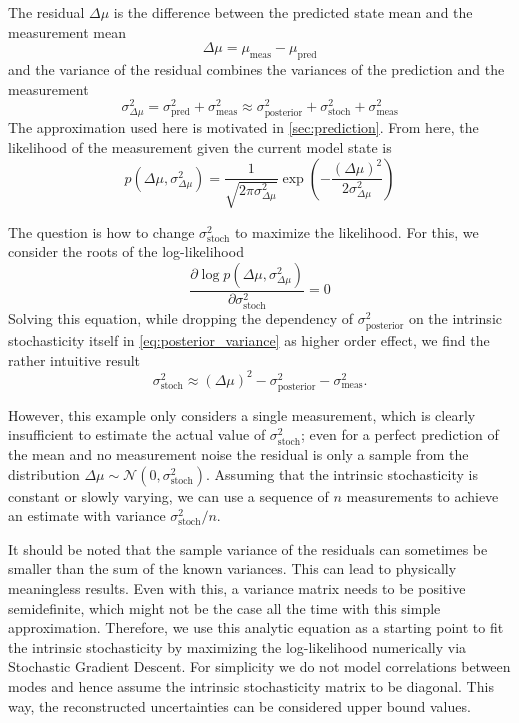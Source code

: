 \documentclass[9pt, twocolumn,superscriptaddress]{revtex4}
\begin{document}
The residual \(\Delta \mu\) is the difference between the predicted state mean and the measurement mean 
\begin{equation}
    \Delta \mu = \mu_{\text{meas}} - \mu_{\text{pred}}
\end{equation}
 and the variance of the residual combines the variances of the prediction and the measurement
 \begin{equation}
     \sigma^2_{\Delta \mu} = \sigma^2_{\text{pred}} + \sigma^2_{\text{meas}} \approx \sigma^2_{\text{posterior}} + \sigma^2_{\text{stoch}} + \sigma^2_{\text{meas}} 
     \label{eq:variance_residual}
 \end{equation}
The approximation used here is motivated in \cref{sec:prediction}. From here, the likelihood of the measurement given the current model state is
\begin{equation}
   p(\Delta \mu, \sigma^2_{\Delta \mu}) = \frac{1}{\sqrt{2\pi \sigma^2_{\Delta \mu}}} \exp\left( -\frac{(\Delta \mu)^2}{2 \sigma^2_{\Delta \mu}} \right) 
   \label{eq:likelihood}
\end{equation}

The question is how to change $\sigma^2_{\text{stoch}}$ to maximize the likelihood. For this, we consider the roots of the log-likelihood 
\[ \frac{\partial \log p(\Delta \mu, \sigma^2_{\Delta \mu})}{\partial \sigma^2_{\text{stoch}}} = 0
\]
Solving this equation, while dropping the dependency of $\sigma^2_{\text{posterior}}$ on the intrinsic stochasticity itself in \cref{eq:posterior_variance} as higher order effect, we find the rather intuitive result
\[
\sigma^2_{\text{stoch}} \approx  (\Delta \mu)^2 - \sigma^2_{\text{posterior}} - \sigma^2_{\text{meas}}.
\]

However, this example only considers a single measurement, which is clearly insufficient to estimate the actual value of \(\sigma^2_{\text{stoch}} \); even for a perfect prediction of the mean and no measurement noise the residual is only a sample from the distribution \( \Delta \mu \sim \mathcal{N}(0,\sigma^2_{\text{stoch}})\). Assuming that the intrinsic stochasticity is constant or slowly varying, we can use a sequence of $n$ measurements to achieve an estimate with variance  $\sigma^2_{\text{stoch}}/n$.

It should be noted that the sample variance of the residuals can sometimes be smaller than the sum of the known variances. This can lead to physically meaningless results. Even with this, a variance matrix needs to be positive semidefinite, which might not be the case all the time with this simple approximation. Therefore, we use this analytic equation as a starting point to fit the intrinsic stochasticity by maximizing the log-likelihood numerically via Stochastic Gradient Descent. For simplicity we do not model correlations between modes and hence assume the intrinsic stochasticity matrix to be diagonal. This way, the reconstructed uncertainties can be considered upper bound values.
\end{document}
